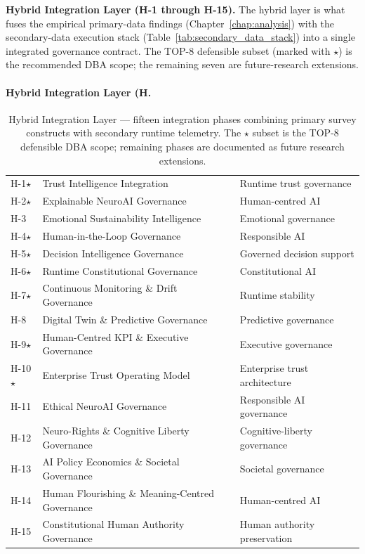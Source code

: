 \noindent\textbf{Hybrid Integration Layer (H-1 through H-15).} The hybrid layer is what fuses the empirical primary-data findings (Chapter~\ref{chap:analysis}) with the secondary-data execution stack (Table~\ref{tab:secondary_data_stack}) into a single integrated governance contract. The TOP-8 defensible subset (marked with $\star$) is the recommended DBA scope; the remaining seven are future-research extensions.

\paragraph{Hybrid Integration Layer (H.}
{\tablestripes\tablefontsize
{}
\begin{xltabular}{\textwidth}{@{} >{\centering\arraybackslash}p{1.0cm} p{7.5cm} >{\raggedright\arraybackslash}p{5.8cm} @{}}
\caption[Hybrid Integration Layer (H-1 to H-15)]{Hybrid Integration Layer --- fifteen integration phases combining primary survey constructs with secondary runtime telemetry. The $\star$ subset is the TOP-8 defensible DBA scope; remaining phases are documented as future research extensions.}\label{tab:hybrid_integration_layer} \\
\toprule
{} &  &  \\
\midrule
\endfirsthead
\endhead
\bottomrule
\endlastfoot
H-1$\star$ & Trust Intelligence Integration & Runtime trust governance \\
H-2$\star$ & Explainable NeuroAI Governance & Human-centred AI \\
H-3 & Emotional Sustainability Intelligence & Emotional governance \\
H-4$\star$ & Human-in-the-Loop Governance & Responsible AI \\
H-5$\star$ & Decision Intelligence Governance & Governed decision support \\
H-6$\star$ & Runtime Constitutional Governance & Constitutional AI \\
H-7$\star$ & Continuous Monitoring \& Drift Governance & Runtime stability \\
H-8 & Digital Twin \& Predictive Governance & Predictive governance \\
H-9$\star$ & Human-Centred KPI \& Executive Governance & Executive governance \\
H-10$\star$ & Enterprise Trust Operating Model & Enterprise trust architecture \\
H-11 & Ethical NeuroAI Governance & Responsible AI governance \\
H-12 & Neuro-Rights \& Cognitive Liberty Governance & Cognitive-liberty governance \\
H-13 & AI Policy Economics \& Societal Governance & Societal governance \\
H-14 & Human Flourishing \& Meaning-Centred Governance & Human-centred AI \\
H-15 & Constitutional Human Authority Governance & Human authority preservation \\
\end{xltabular}}
